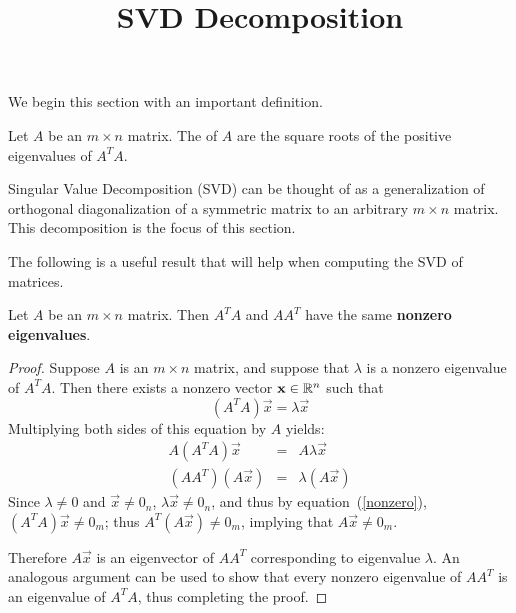 \documentclass{ximera}
\title{SVD Decomposition} \license{CC BY-NC-SA 4.0}
\begin{document}
\begin{abstract}
\end{abstract}
\maketitle

We begin this section with an important definition.

\begin{definition}\label{singularvalues}
Let $A$ be an $m\times n$ matrix. The  of $A$ are the square roots of the positive
eigenvalues of $A^TA.$ 
\end{definition}

Singular Value Decomposition (SVD) can be thought of as
a generalization of orthogonal diagonalization of a symmetric matrix
to an arbitrary $m\times n$ matrix. This decomposition is the focus of this section.

The following is a useful result that will help when computing the SVD of matrices.

\begin{lemma}\label{lem:samenonzeroeigenvalues}
Let $A$ be an $m \times n$ matrix. Then $A^TA$ and $AA^T$ have the same \textbf{nonzero eigenvalues}.
\end{lemma}

\begin{proof}
Suppose $A$ is an $m\times n$ matrix, and suppose that  $\lambda$ is a nonzero eigenvalue of $A^TA$.
Then there exists a nonzero vector $\mathbf{x} \in \mathbb{R}^n$ such that
\begin{equation}\label{nonzero}
(A^TA)\vec{x}=\lambda \vec{x}
\end{equation}
Multiplying both sides of this equation by $A$ yields:
\begin{eqnarray*}
A(A^TA)\vec{x} & = & A\lambda \vec{x}\\
(AA^T)(A\vec{x}) & = & \lambda (A\vec{x})
\end{eqnarray*}
Since $\lambda\neq 0$ and $\vec{x}\neq 0_n$, $\lambda \vec{x}\neq 0_n$,
and thus by equation~(\ref{nonzero}),
$(A^TA)\vec{x}\neq 0_m$; thus $A^T(A\vec{x})\neq 0_m$,
implying that $A\vec{x}\neq 0_m$.

Therefore $A\vec{x}$ is an eigenvector of $AA^T$ corresponding to eigenvalue
$\lambda$.  An analogous argument can be used to show that every
nonzero eigenvalue of $AA^T$ is an eigenvalue of $A^TA$, thus
completing the proof.
\end{proof}
\end{document}
